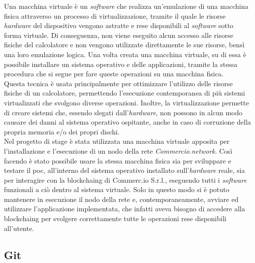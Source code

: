 Una macchina virtuale è un \textit{software} che realizza un'emulazione di una macchina fisica attraverso un processo di virtualizzazione, tramite il quale le risorse \textit{hardware} del dispositivo vengono astratte e rese disponibili al \textit{software} sotto forma virtuale. Di conseguenza, non viene eseguito alcun accesso alle risorse fisiche del calcolatore e non vengono utilizzate direttamente le sue risorse, bensì una loro emulazione logica. Una volta creata una macchina virtuale, su di essa è possibile installare un sistema operativo e delle applicazioni, tramite la stessa procedura che si segue per fare queste operazioni su una macchina fisica.\\
Questa tecnica è usata principalmente per ottimizzare l'utilizzo delle risorse fisiche di un calcolatore, permettendo l'esecuzione contemporanea di più sistemi virtualizzati che svolgono diverse operazioni. Inoltre, la virtualizzazione permette di creare sistemi che, essendo slegati dall'\textit{hardware}, non possono in alcun modo causare dei danni al sistema operativo ospitante, anche in caso di corruzione della propria memoria e/o dei propri dischi.\\
Nel progetto di stage è stata utilizzata una macchina virtuale apposita per l'installazione e l'esecuzione di un nodo della rete \textit{Commercio.network}. Così facendo è stato possibile usare la stessa macchina fisica sia per sviluppare e testare il \gls{poc}, all'interno del sistema operativo installato sull'\textit{hardware} reale, sia per interagire con la \gls{blockchaing} di Commerc.io S.r.l., eseguendo tutti i \textit{software} funzionali a ciò dentro al sistema virtuale. Solo in questo modo si è potuto mantenere in esecuzione il nodo della rete e, contemporaneamente, avviare ed utilizzare l'applicazione implementata, che infatti aveva bisogno di accedere alla \gls{blockchaing} per svolgere correttamente tutte le operazioni rese disponibili all'utente.

\subsection{Git}

